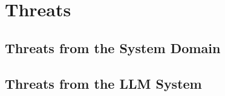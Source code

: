 \section{Threats}

\subsection{Threats from the System Domain}

\subsection{Threats from the LLM System}